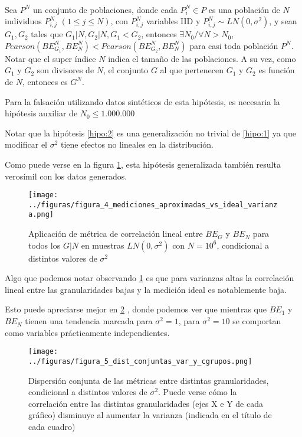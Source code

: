 \begin{hipotesis}\label{hipo:2}
    \\
    Sea $P^N$ un conjunto de poblaciones, donde cada $P^N_i \in P$ es una población de $N$ individuos $P^N_{i,j}$ $(1 \leq j \leq N)$, con $P^N_{i,j}$ variables IID y $P^N_{i,j} \sim LN(0,\sigma^2)$, y sean $G_1, G_2$ tales que $G_1|N, G_2|N, G_1 < G_2$, entonces $\exists N_0 / \forall N > N_0 $, $Pearson(BE^N_{G_1},BE^N_N) < Pearson(BE^N_{G_2},BE^N_N)$ para casi toda población $P^N$. Notar que el super índice $N$ indica el tamaño de las poblaciones. A su vez, como $G_1$ y $G_2$ son divisores de $N$, el conjunto $G$ al que pertenecen $G_1$ y $G_2$ es función de $N$, entonces es $G^N$.
    
    Para la falsación utilizando datos sintéticos de esta hipótesis, es necesaria la hipótesis auxiliar de $N_0 \leq 1.000.000$  
\end{hipotesis}

Notar que la hipótesis \ref{hipo:2} es una generalización no trivial de \ref{hipo:1} ya que modificar el $\sigma^2$ tiene efectos no lineales en la distribución.

Como puede verse en la figura \ref{fig:4}, esta hipótesis generalizada también resulta verosímil con los datos generados.

\begin{figure}[H]
    \centering 
    \texttt{[image: ../figuras/figura\_4\_mediciones\_aproximadas\_vs\_ideal\_varianza.png]} 
    \caption{Aplicación de métrica de correlación lineal entre $BE_G$ y $BE_N$ para todos los $G | N$ en muestras $LN(0,\sigma^2)$ con $N=10^6$, condicional a distintos valores de $\sigma^2$}
    \label{fig:4}
\end{figure}

Algo que podemos notar observando \ref{fig:4} es que para varianzas altas la correlación lineal entre las granularidades bajas y la medición ideal es notablemente baja.

Esto puede apreciarse mejor en \ref{fig:5} , donde podemos ver que mientras que $BE_1$ y $BE_N$ tienen una tendencia marcada para $\sigma^2=1$, para $\sigma^2=10$ se comportan como variables prácticamente independientes.

\begin{figure}[H]
    \centering 
    \texttt{[image: ../figuras/figura\_5\_dist\_conjuntas\_var\_y\_cgrupos.png]} 
    \caption{Dispersión conjunta de las métricas entre distintas granularidades, condicional a distintos valores de $\sigma^2$. Puede verse cómo la correlación entre las distintas granularidades (ejes X e Y de cada gráfico) disminuye al aumentar la varianza (indicada en el título de cada cuadro)}
    \label{fig:5}
\end{figure}



